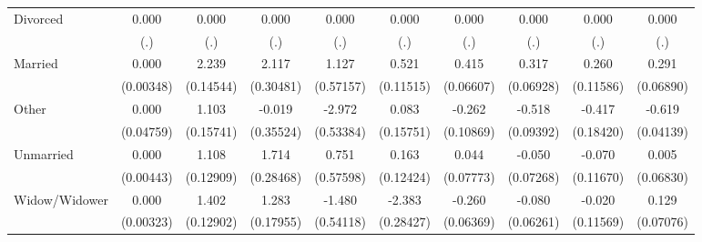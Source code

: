 {\begin{tabular}{l*{9}{c}}
Divorced            &       0.000         &       0.000         &       0.000         &       0.000         &       0.000         &       0.000         &       0.000         &       0.000         &       0.000         \\
                    &         (.)         &         (.)         &         (.)         &         (.)         &         (.)         &         (.)         &         (.)         &         (.)         &         (.)         \\
Married             &       0.000         &       2.239\sym{***}&       2.117\sym{***}&       1.127\sym{*}  &       0.521\sym{***}&       0.415\sym{***}&       0.317\sym{***}&       0.260\sym{*}  &       0.291\sym{***}\\
                    &   (0.00348)         &   (0.14544)         &   (0.30481)         &   (0.57157)         &   (0.11515)         &   (0.06607)         &   (0.06928)         &   (0.11586)         &   (0.06890)         \\
Other               &       0.000         &       1.103\sym{***}&      -0.019         &      -2.972\sym{***}&       0.083         &      -0.262\sym{*}  &      -0.518\sym{***}&      -0.417\sym{*}  &      -0.619\sym{***}\\
                    &   (0.04759)         &   (0.15741)         &   (0.35524)         &   (0.53384)         &   (0.15751)         &   (0.10869)         &   (0.09392)         &   (0.18420)         &   (0.04139)         \\
Unmarried           &       0.000         &       1.108\sym{***}&       1.714\sym{***}&       0.751         &       0.163         &       0.044         &      -0.050         &      -0.070         &       0.005         \\
                    &   (0.00443)         &   (0.12909)         &   (0.28468)         &   (0.57598)         &   (0.12424)         &   (0.07773)         &   (0.07268)         &   (0.11670)         &   (0.06830)         \\
Widow/Widower       &       0.000         &       1.402\sym{***}&       1.283\sym{***}&      -1.480\sym{**} &      -2.383\sym{***}&      -0.260\sym{***}&      -0.080         &      -0.020         &       0.129         \\
                    &   (0.00323)         &   (0.12902)         &   (0.17955)         &   (0.54118)         &   (0.28427)         &   (0.06369)         &   (0.06261)         &   (0.11569)         &   (0.07076)         \\

\end{tabular}}

